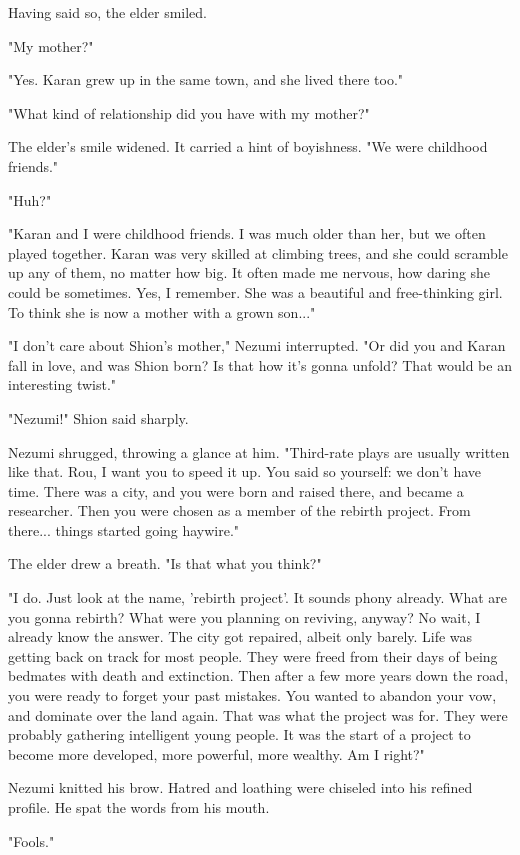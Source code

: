 Having said so, the elder smiled.

"My mother?"

"Yes. Karan grew up in the same town, and she lived there too."

"What kind of relationship did you have with my mother?"

The elder's smile widened. It carried a hint of boyishness. "We were
childhood friends."

"Huh?"

"Karan and I were childhood friends. I was much older than her, but we
often played together. Karan was very skilled at climbing trees, and she
could scramble up any of them, no matter how big. It often made me
nervous, how daring she could be sometimes. Yes, I remember. She was a
beautiful and free-thinking girl. To think she is now a mother with a
grown son..."

"I don't care about Shion's mother," Nezumi interrupted. "Or did you and
Karan fall in love, and was Shion born? Is that how it's gonna unfold?
That would be an interesting twist."

"Nezumi!" Shion said sharply.

Nezumi shrugged, throwing a glance at him. "Third-rate plays are usually
written like that. Rou, I want you to speed it up. You said so yourself:
we don't have time. There was a city, and you were born and raised
there, and became a researcher. Then you were chosen as a member of the
rebirth project. From there... things started going haywire."

The elder drew a breath. "Is that what you think?"

"I do. Just look at the name, 'rebirth project'. It sounds phony
already. What are you gonna rebirth? What were you planning on reviving,
anyway? No wait, I already know the answer. The city got repaired,
albeit only barely. Life was getting back on track for most people. They
were freed from their days of being bedmates with death and extinction.
Then after a few more years down the road, you were ready to forget your
past mistakes. You wanted to abandon your vow, and dominate over the
land again. That was what the project was for. They were probably
gathering intelligent young people. It was the start of a project to
become more developed, more powerful, more wealthy. Am I right?"

Nezumi knitted his brow. Hatred and loathing were chiseled into his
refined profile. He spat the words from his mouth.

"Fools."

